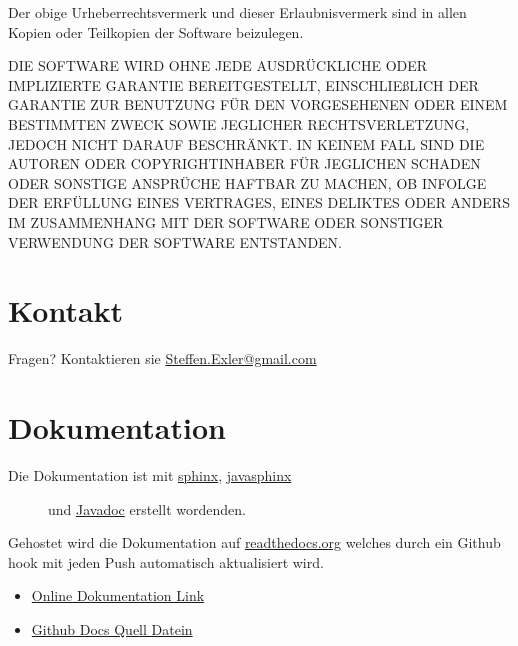 \documentclass[letterpaper,10pt,ngerman]{sphinxmanual}
\begin{document}
Der obige Urheberrechtsvermerk und dieser Erlaubnisvermerk sind in allen Kopien oder Teilkopien der Software beizulegen.

DIE SOFTWARE WIRD OHNE JEDE AUSDRÜCKLICHE ODER IMPLIZIERTE GARANTIE BEREITGESTELLT, EINSCHLIEßLICH DER GARANTIE ZUR BENUTZUNG FÜR DEN VORGESEHENEN ODER EINEM BESTIMMTEN ZWECK SOWIE JEGLICHER RECHTSVERLETZUNG, JEDOCH NICHT DARAUF BESCHRÄNKT. IN KEINEM FALL SIND DIE AUTOREN ODER COPYRIGHTINHABER FÜR JEGLICHEN SCHADEN ODER SONSTIGE ANSPRÜCHE HAFTBAR ZU MACHEN, OB INFOLGE DER ERFÜLLUNG EINES VERTRAGES, EINES DELIKTES ODER ANDERS IM ZUSAMMENHANG MIT DER SOFTWARE ODER SONSTIGER VERWENDUNG DER SOFTWARE ENTSTANDEN.


\section{Kontakt}
\label{license:kontakt}
Fragen? Kontaktieren sie \href{mailto:Steffen.Exler@gmail.com}{Steffen.Exler@gmail.com}


\section{Dokumentation}
\label{docs:dokumentation}\label{docs::doc}
\begin{description}
\item[{Die Dokumentation ist mit \href{http://www.sphinx-doc.org/en/1.4.8/}{sphinx}, \href{https://bronto.github.io/javasphinx/}{javasphinx}}] \leavevmode
und \href{https://en.wikipedia.org/wiki/Javadoc}{Javadoc}  erstellt wordenden.

\end{description}

Gehostet wird die Dokumentation auf \href{https://readthedocs.org/}{readthedocs.org} welches durch ein Github hook mit jeden Push automatisch aktualisiert wird.
\begin{itemize}
\item {} 
\href{https://readthedocs.org/projects/polynomials-calculator/}{Online Dokumentation Link}

\item {} 
\href{https://github.com/linuxluigi/polynomials-calculator/tree/master/docs}{Github Docs Quell Datein}

\end{itemize}
\end{document}
